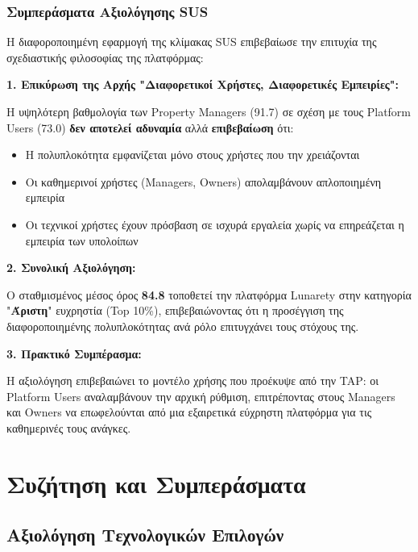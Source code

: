\documentclass[
	12pt, %
	oneside, %
	greek,
	onehalfspacing, %
	liststotoc, %
	toctotoc, %
	parskip, %
	headsepline, %
]{MastersDoctoralThesis} %
\begin{document}
\subsection{Συμπεράσματα Αξιολόγησης SUS}

Η διαφοροποιημένη εφαρμογή της κλίμακας SUS επιβεβαίωσε την επιτυχία της σχεδιαστικής φιλοσοφίας της πλατφόρμας:

\textbf{1. Επικύρωση της Αρχής "Διαφορετικοί Χρήστες, Διαφορετικές Εμπειρίες":}

Η υψηλότερη βαθμολογία των Property Managers (91.7) σε σχέση με τους Platform Users (73.0) \textbf{δεν αποτελεί αδυναμία} αλλά \textbf{επιβεβαίωση} ότι:
\begin{itemize}
    \item Η πολυπλοκότητα εμφανίζεται μόνο στους χρήστες που την χρειάζονται
    \item Οι καθημερινοί χρήστες (Managers, Owners) απολαμβάνουν απλοποιημένη εμπειρία
    \item Οι τεχνικοί χρήστες έχουν πρόσβαση σε ισχυρά εργαλεία χωρίς να επηρεάζεται η εμπειρία των υπολοίπων
\end{itemize}

\textbf{2. Συνολική Αξιολόγηση:}

Ο σταθμισμένος μέσος όρος \textbf{84.8} τοποθετεί την πλατφόρμα Lunarety στην κατηγορία "\textbf{Άριστη}" ευχρηστία (Top 10\%), επιβεβαιώνοντας ότι η προσέγγιση της διαφοροποιημένης πολυπλοκότητας ανά ρόλο επιτυγχάνει τους στόχους της.

\textbf{3. Πρακτικό Συμπέρασμα:}

Η αξιολόγηση επιβεβαιώνει το μοντέλο χρήσης που προέκυψε από την TAP: οι Platform Users αναλαμβάνουν την αρχική ρύθμιση, επιτρέποντας στους Managers και Owners να επωφελούνται από μια εξαιρετικά εύχρηστη πλατφόρμα για τις καθημερινές τους ανάγκες.


\chapter{Συζήτηση και Συμπεράσματα}
\label{chap:conclusions}

\section{Αξιολόγηση Τεχνολογικών Επιλογών}
\label{sec:tech-evaluation}
\end{document}
